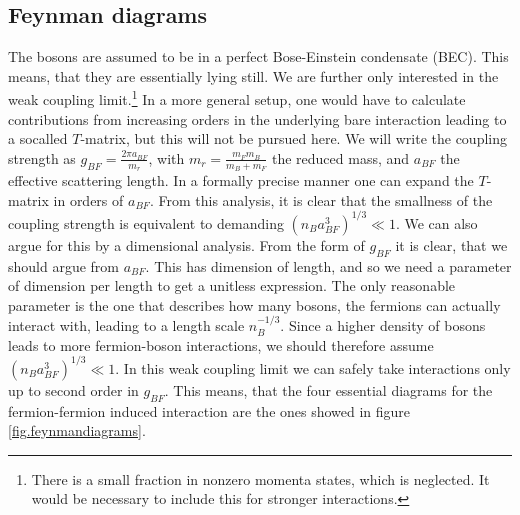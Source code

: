 \subsection{Feynman diagrams} \label{subsec.Feynmandiagrams}
The bosons are assumed to be in a perfect Bose-Einstein condensate (BEC). This means, that they are essentially lying still. We are further only interested in the weak coupling limit.\footnote{There is a small fraction in nonzero momenta states, which is neglected. It would be necessary to include this for stronger interactions.} In a more general setup, one would have to calculate contributions from increasing orders in the underlying bare interaction leading to a socalled $T$-matrix, but this will not be pursued here. We will write the coupling strength as $g_{BF} = \frac{2\pi a_{BF}}{m_r}$, with $m_r = \frac{m_Fm_B}{m_B + m_F}$ the reduced mass, and $a_{BF}$ the effective scattering length. In a formally precise manner one can expand the $T$-matrix in orders of $a_{BF}$. From this analysis, it is clear that the smallness of the coupling strength is equivalent to demanding $(n_Ba_{BF}^3)^{1/3}\ll 1$. We can also argue for this by a dimensional analysis. From the form of $g_{BF}$ it is clear, that we should argue from $a_{BF}$. This has dimension of length, and so we need a parameter of dimension per length to get a unitless expression. The only reasonable parameter is the one that describes how many bosons, the fermions can actually interact with, leading to a length scale $n_B^{-1/3}$. Since a higher density of bosons leads to more fermion-boson interactions, we should therefore assume $(n_Ba_{BF}^3)^{1/3} \ll 1$. In this weak coupling limit we can safely take interactions only up to second order in $g_{BF}$. This means, that the four essential diagrams for the fermion-fermion induced interaction are the ones showed in figure \ref{fig.feynmandiagrams}. 

